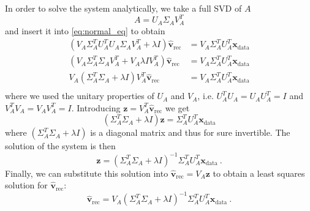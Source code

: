 \documentclass[a4paper]{article}
\begin{document}
In order to solve the system analytically, we take a full SVD of $A$
\begin{equation}
    A = U_A \Sigma_A V_A^T
\end{equation}
and insert it into \eqref{eq:normal_eq} to obtain
\begin{align}
    (V_A\Sigma_A^T U_A^T U_A \Sigma_A V_A^T + \lambda I)\hat{\mathbf{v}}_\mathrm{rec} &= V_A\Sigma_A^T U_A^T \mathbf{x}_\mathrm{data}\\
    \label{eq:unitary}
    (V_A\Sigma_A^T \Sigma_A V_A^T + V_A \lambda I V_A^T)\hat{\mathbf{v}}_\mathrm{rec} &= V_A\Sigma_A^T U_A^T \mathbf{x}_\mathrm{data}\\
    V_A(\Sigma_A^T \Sigma_A + \lambda I) V_A^T \hat{\mathbf{v}}_\mathrm{rec} &= V_A\Sigma_A^T U_A^T \mathbf{x}_\mathrm{data}\\
\end{align}
where we used the unitary properties of $U_A$ and $V_A$, i.e. $U_A^T U_A = U_A U_A^T= I$ and $V_A^T V_A = V_A V_A^T= I$.
Introducing $\mathbf{z} = V_A^T \hat{\mathbf{v}}_\mathrm{rec}$ we get
\begin{equation}
    (\Sigma_A^T \Sigma_A + \lambda I) \mathbf{z} = \Sigma_A^T U_A^T \mathbf{x}_\mathrm{data}
\end{equation}
where $(\Sigma_A^T \Sigma_A + \lambda I)$ is a diagonal matrix and thus for sure invertible. The solution of the system is then
\begin{equation}
    \mathbf{z} = (\Sigma_A^T \Sigma_A + \lambda I)^{-1} \Sigma_A^T U_A^T \mathbf{x}_\mathrm{data}~.
\end{equation}
Finally, we can substitute this solution into $\hat{\mathbf{v}}_\mathrm{rec} = V_A \mathbf{z}$ to obtain a least squares solution for $\hat{\mathbf{v}}_\mathrm{rec}$:
\begin{equation}
    \hat{\mathbf{v}}_\mathrm{rec} = V_A (\Sigma_A^T \Sigma_A + \lambda I)^{-1} \Sigma_A^T U_A^T \mathbf{x}_\mathrm{data}~.
\end{equation}


\end{document}

